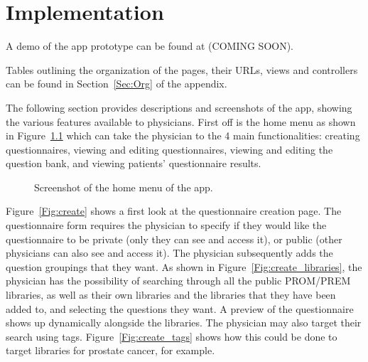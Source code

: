 \documentclass{higrep}
\newcommand{\sectionref}[1]{Section~\ref{#1}}
\newcommand{\figureref}[1]{Figure~\ref{#1}}
\begin{document}
\chapter{Implementation}\label{Sec:Implementation}

A demo of the app prototype can be found at (COMING SOON).%

Tables outlining the organization of the pages, their URLs, views and controllers can be found in \sectionref{Sec:Org} of the appendix.

The following section provides descriptions and screenshots of the app, showing the various features available to physicians. First off is the home menu as shown in \figureref{Fig:home} which can take the physician to the 4 main functionalities: creating questionnaires, viewing and editing questionnaires, viewing and editing the question bank, and viewing patients' questionnaire results.

\begin{figure}[htbp]
  \centering
  \caption{Screenshot of the home menu of the app.} \label{Fig:home}
\end{figure}

\figureref{Fig:create} shows a first look at the questionnaire creation page. The questionnaire form requires the physician to specify if they would like the questionnaire to be private (only they can see and access it), or public (other physicians can also see and access it). The physician subsequently adds the question groupings that they want. As shown in \figureref{Fig:create_libraries}, the physician has the possibility of searching through all the public PROM/PREM libraries, as well as their own libraries and the libraries that they have been added to, and selecting the questions they want. A preview of the questionnaire shows up dynamically alongside the libraries. The physician may also target their search using tags. \figureref{Fig:create_tags} shows how this could be done to target libraries for prostate cancer, for example.
\end{document}
